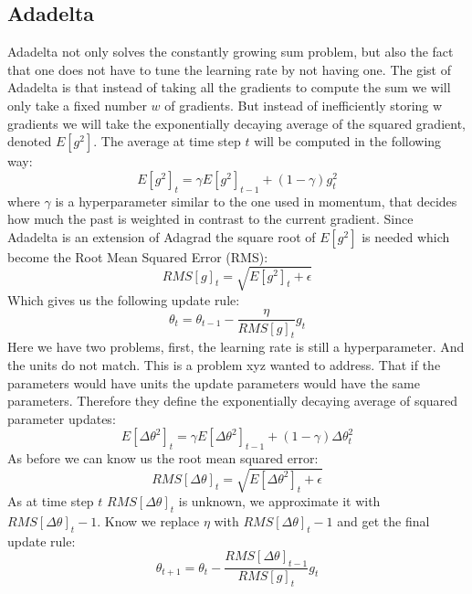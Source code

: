 \subsection{Adadelta}\label{ssec:adadelta}
Adadelta \cite{adadelta} not only solves the constantly growing sum problem, but also the fact that one does not have to tune the learning rate by not having one. The gist of Adadelta is that instead of taking all the gradients to compute the sum we will only take a fixed number $w$ of gradients. But instead of inefficiently storing w gradients we will take the exponentially decaying average of the squared gradient, denoted $E[g^{2}]$. The average at time step $t$ will be computed in the following way: 
\begin{equation}
E[g^2]_t = \gamma E[g^2]_{t-1} + (1 - \gamma) g^2_t
\end{equation}
where $\gamma$ is a hyperparameter similar to the one used in momentum, that decides how much the past is weighted in contrast to the current gradient. Since Adadelta is an extension of Adagrad the square root of $E[g^{2}]$ is needed which become the Root Mean Squared Error (RMS):
\begin{equation}
RMS[g]_t = \sqrt{E[g^2]_t + \epsilon}
\end{equation}
Which gives us the following update rule: 
\begin{equation}
\theta_t = \theta_{t-1} - \frac{\eta}{RMS[g]_t}g_t
\end{equation}
Here we have two problems, first, the learning rate is still a hyperparameter. And the units do not match. This is a problem xyz wanted to address. That if the parameters would have units the update parameters would have the same parameters. 
Therefore they define the exponentially decaying average of squared parameter updates: 
\begin{equation}
E[\Delta \theta^2]_t = \gamma E[\Delta \theta^2]_{t-1} + (1 - \gamma) \Delta \theta^2_t
\end{equation}
As before we can know us the root mean squared error: 
\begin{equation}
RMS[\Delta \theta]_{t} = \sqrt{E[\Delta \theta^2]_t + \epsilon}
\end{equation}
As at time step $t$ $RMS[\Delta \theta]_{t} $ is unknown, we approximate it with $ RMS[\Delta \theta]_{t}-1$. Know we replace $\eta$ with  $ RMS[\Delta \theta]_{t}-1$ and get the final update rule: 
\begin{equation}
 \theta_{t+1} = \theta_t - \dfrac{RMS[\Delta \theta]_{t-1}}{RMS[g]_{t}} g_{t}
\end{equation}
